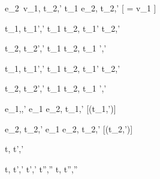  {e_2\ {v_1},\sigma {\normalise} {t_2},{\sigma}'}
  {t_1 \Next e_2,\sigma \xrightarrow[]{\Continue} {t_2},{\sigma}'}
  [ = {v_1} \land \neg{}]


  {t_1,\sigma {} {t_1}',{\sigma}'}
  {t_1 \And t_2,\sigma {} {t_1}' \And t_2,{\sigma}'}

  {t_2,\sigma {} {t_2}',{\sigma}'}
  {t_1 \And t_2,\sigma {} t_1 ',{\sigma}'}


  {t_1,\sigma {} {t_1}',{\sigma}'}
  {t_1 \Or t_2,\sigma {} {t_1}' \Or t_2,{\sigma}'}

  {t_2,\sigma {} {t_2}',{\sigma}' }
  {t_1 \Or t_2,\sigma {} t_1 ',{\sigma}'}


  {e_1,\sigma {},{\sigma}'}
  {e_1 \Xor e_2,\sigma \xrightarrow[]{\Left} {t_1},{\sigma}'}
  [\neg\Failing({t_1},{\sigma}')]

  {e_2,\sigma {\normalise} {t_2},{\sigma}'}
  {e_1 \Xor e_2,\sigma \xrightarrow[]{\Right} {t_2},{\sigma}'}
  [\neg\Failing({t_2},{\sigma}')]




  {t,\sigma {} t',\sigma'}



  {t,\sigma {} {t}',{\sigma}' \Quad
   {t}',{\sigma}' {\normalise} {t}'',{\sigma}''}
  {t,\sigma {} {t}'',{\sigma}''}

